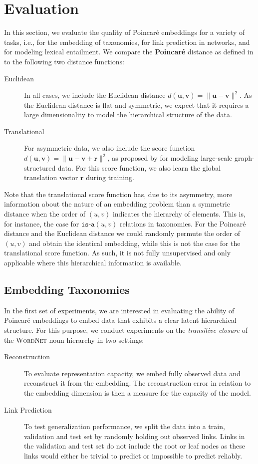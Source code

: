 \documentclass[11pt]{article}
\renewcommand{\vec}[1]{\bm{#1}}
\newcommand{\vu}{\vec{u}}
\newcommand{\vv}{\vec{v}}
\newcommand{\vr}{\vec{r}}
\newcommand{\method}[1]{\textsc{#1}\xspace}
\begin{document}
\section{Evaluation}
\label{sec:experiments}
In this section, we evaluate the quality of Poincaré embeddings for a variety of
tasks, i.e., for the embedding of taxonomies, for link prediction in networks,
and for modeling lexical entailment. We compare the \textbf{Poincaré} distance
as defined in  to the following two distance functions:
\begin{description}
\item[{Euclidean}] In all cases, we include the Euclidean distance \({d(\vu,\vv) =
               \|\vu - \vv\|^2}\). As the Euclidean distance is flat and
symmetric, we expect that it requires a large dimensionality
to model the hierarchical structure of the data.
\item[{Translational}] For asymmetric data, we also include the score
function \({d(\vu, \vv) = \|\vu - \vv + \vr\|^2}\), as proposed
by \citet{DBLP:conf/nips/BordesUGWY13} for modeling large-scale
graph-structured data. For this score function, we also learn
the global translation vector \(\vr\) during training.
\end{description}
Note that the translational score function has, due to its asymmetry, more
information about the nature of an embedding problem than a symmetric distance
when the order of \((u,v)\) indicates the hierarchy of elements. This is, for
instance, the case for \({\texttt{is-a}(u,v)}\) relations in taxonomies. For the
Poincaré distance and the Euclidean distance we could randomly permute the order
of \((u,v)\) and obtain the identical embedding, while this is not the case for
the translational score function. As such, it is not fully unsupervised and
only applicable where this hierarchical information is available.

\subsection{Embedding Taxonomies}
\label{sec:taxonomies}
In the first set of experiments, we are interested in evaluating the ability of
Poincaré embeddings to embed data that exhibits a clear latent hierarchical structure. 
For this purpose, we conduct experiments on the \emph{transitive closure} of the \method{WordNet}
noun hierarchy \cite{miller1998wordnet} in two settings:

\begin{description}
\item[{Reconstruction}] To evaluate representation capacity, we embed fully observed data and
reconstruct it from the embedding. The reconstruction error
in relation to the embedding dimension is then a measure for
the capacity of the model.
\item[{Link Prediction}] To test generalization performance, we split the data
into a train, validation and test set by randomly holding out observed
links. Links in the validation and test set do not include the root or
leaf nodes as these links would either be trivial to predict or impossible
to predict reliably.
\end{description}
\end{document}
